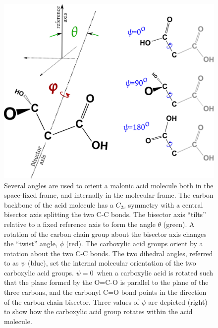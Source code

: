 \begin{figure}[h!]
	\begin{center}
		\includegraphics[scale=1.0]{images/malonic-angles/malonic-angles.png}
		\caption{Several angles are used to orient a malonic acid molecule both in the space-fixed frame, and internally in the molecular frame. The carbon backbone of the acid molecule has a $C_{2v}$ symmetry with a central bisector axis splitting the two C-C bonds. The bisector axis ``tilts'' relative to a fixed reference axis to form the angle $\theta$ (green). A rotation of the carbon chain group about the bisector axis changes the ``twist'' angle, $\phi$ (red). The carboxylic acid groups orient by a rotation about the two C-C bonds. The two dihedral angles, referred to as $\psi$ (blue), set the internal molecular orientation of the two carboxylic acid groups. $\psi=0$\textdegree~when a carboxylic acid is rotated such that the plane formed by the O=C-O is parallel to the plane of the three carbons, and the carbonyl C=O bond points in the direction of the carbon chain bisector. Three values of $\psi$ are depicted (right) to show how the carboxylic acid group rotates within the acid molecule.}
		\label{fig:angle-definitions}
	\end{center}
\end{figure}

